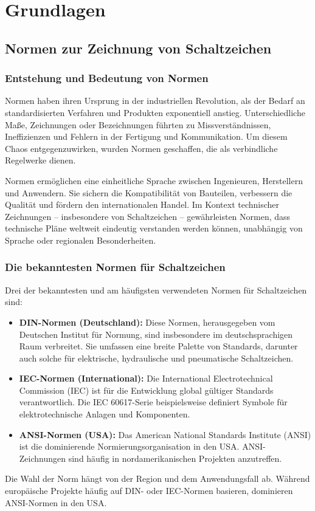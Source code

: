 \chapter{Grundlagen}
\label{cha:Grundlagen}
\section{Normen zur Zeichnung von Schaltzeichen}

\subsection*{Entstehung und Bedeutung von Normen}
Normen haben ihren Ursprung in der industriellen Revolution, als der Bedarf an standardisierten Verfahren und Produkten exponentiell anstieg. Unterschiedliche Maße, Zeichnungen oder Bezeichnungen führten zu Missverständnissen, Ineffizienzen und Fehlern in der Fertigung und Kommunikation. Um diesem Chaos entgegenzuwirken, wurden Normen geschaffen, die als verbindliche Regelwerke dienen.

Normen ermöglichen eine einheitliche Sprache zwischen Ingenieuren, Herstellern und Anwendern. Sie sichern die Kompatibilität von Bauteilen, verbessern die Qualität und fördern den internationalen Handel. Im Kontext technischer Zeichnungen – insbesondere von Schaltzeichen – gewährleisten Normen, dass technische Pläne weltweit eindeutig verstanden werden können, unabhängig von Sprache oder regionalen Besonderheiten.

\subsection*{Die bekanntesten Normen für Schaltzeichen}

Drei der bekanntesten und am häufigsten verwendeten Normen für Schaltzeichen sind:
\begin{itemize}
\item \textbf{DIN-Normen (Deutschland): }Diese Normen, herausgegeben vom Deutschen Institut für Normung, sind insbesondere im deutschsprachigen Raum verbreitet. Sie umfassen eine breite Palette von Standards, darunter auch solche für elektrische, hydraulische und pneumatische Schaltzeichen.
\item \textbf{IEC-Normen (International):} Die International Electrotechnical Commission (IEC) ist für die Entwicklung global gültiger Standards verantwortlich. Die IEC 60617-Serie beispielsweise definiert Symbole für elektrotechnische Anlagen und Komponenten.
\item \textbf{ANSI-Normen (USA): }Das American National Standards Institute (ANSI) ist die dominierende Normierungsorganisation in den USA. ANSI-Zeichnungen sind häufig in nordamerikanischen Projekten anzutreffen.
\end{itemize}
Die Wahl der Norm hängt von der Region und dem Anwendungsfall ab. Während europäische Projekte häufig auf DIN- oder IEC-Normen basieren, dominieren ANSI-Normen in den USA.

